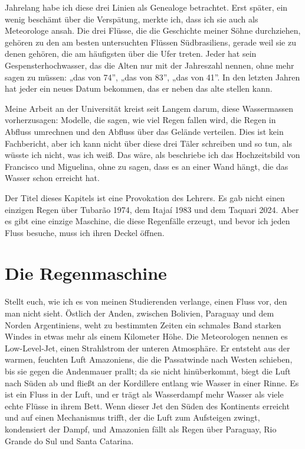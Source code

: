 \documentclass[
  ngerman,
  11pt,
  openany]{book}
\begin{document}
Jahrelang habe ich diese drei Linien als Genealoge betrachtet. Erst
später, ein wenig beschämt über die Verspätung, merkte ich, dass ich sie
auch als Meteorologe ansah. Die drei Flüsse, die die Geschichte meiner
Söhne durchziehen, gehören zu den am besten untersuchten Flüssen
Südbrasiliens, gerade weil sie zu denen gehören, die am häufigsten über
die Ufer treten. Jeder hat sein Gespensterhochwasser, das die Alten nur
mit der Jahreszahl nennen, ohne mehr sagen zu müssen: „das von 74'',
„das von 83'', „das von 41''. In den letzten Jahren hat jeder ein neues
Datum bekommen, das er neben das alte stellen kann.

Meine Arbeit an der Universität kreist seit Langem darum, diese
Wassermassen vorherzusagen: Modelle, die sagen, wie viel Regen fallen
wird, die Regen in Abfluss umrechnen und den Abfluss über das Gelände
verteilen. Dies ist kein Fachbericht, aber ich kann nicht über diese
drei Täler schreiben und so tun, als wüsste ich nicht, was ich weiß. Das
wäre, als beschriebe ich das Hochzeitsbild von Francisco und Miguelina,
ohne zu sagen, dass es an einer Wand hängt, die das Wasser schon
erreicht hat.

Der Titel dieses Kapitels ist eine Provokation des Lehrers. Es gab nicht
einen einzigen Regen über Tubarão 1974, dem Itajaí 1983 und dem Taquari
2024. Aber es gibt eine einzige Maschine, die diese Regenfälle erzeugt,
und bevor ich jeden Fluss besuche, muss ich ihren Deckel öffnen.

\section{Die Regenmaschine}\label{die-regenmaschine}

Stellt euch, wie ich es von meinen Studierenden verlange, einen Fluss
vor, den man nicht sieht. Östlich der Anden, zwischen Bolivien, Paraguay
und dem Norden Argentiniens, weht zu bestimmten Zeiten ein schmales Band
starken Windes in etwas mehr als einem Kilometer Höhe. Die Meteorologen
nennen es Low-Level-Jet, einen Strahlstrom der unteren Atmosphäre. Er
entsteht aus der warmen, feuchten Luft Amazoniens, die die Passatwinde
nach Westen schieben, bis sie gegen die Andenmauer prallt; da sie nicht
hinüberkommt, biegt die Luft nach Süden ab und fließt an der Kordillere
entlang wie Wasser in einer Rinne. Es ist ein Fluss in der Luft, und er
trägt als Wasserdampf mehr Wasser als viele echte Flüsse in ihrem Bett.
Wenn dieser Jet den Süden des Kontinents erreicht und auf einen
Mechanismus trifft, der die Luft zum Aufsteigen zwingt, kondensiert der
Dampf, und Amazonien fällt als Regen über Paraguay, Rio Grande do Sul
und Santa Catarina.
\end{document}
